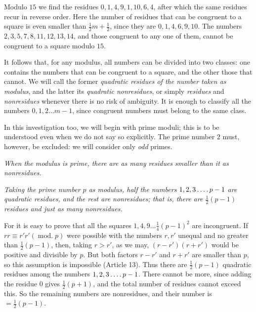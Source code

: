 Modulo $15$ we find the residues $0,1,4,9,1,10,6,4$, after which the same residues recur in reverse order. Here the number of residues that can be congruent to a square is even smaller than $\tfrac12m+\tfrac12$, since they are $0,1,4,6,9,10$. The numbers $2,3,5,7,8,11,12,13,14$, and those congruent to any one of them, cannot be congruent to a square modulo $15$.

It follows that, for any modulus, all numbers can be divided into two classes: one contains the numbers that can be congruent to a square, and the other those that cannot. We will call the former \emph{quadratic residues of the number taken as modulus}, and the latter its \emph{quadratic nonresidues}, or simply \emph{residues} and \emph{nonresidues} whenever there is no risk of ambiguity. It is enough to classify all the numbers $0,1,2\ldots m-1$, since congruent numbers must belong to the same class.

In this investigation too, we will begin with prime moduli; this is to be understood even when we do not say so explicitly. The prime number $2$ must, however, be excluded: we will consider only \emph{odd} primes.

\begin{center}\small\emph{When the modulus is prime, there are as many residues smaller than it as nonresidues.}\end{center}

\emph{Taking the prime number $p$ as modulus, half the numbers $1,2,3\mathinner{\ldotp\ldotp\ldotp\ldotp} p-1$ are quadratic residues, and the rest are nonresidues; that is, there are $\tfrac12(p-1)$ residues and just as many nonresidues.}

For it is easy to prove that all the squares $1,4,9\ldots\tfrac14(p-1)^2$ are incongruent. If $rr\equiv r'r'(\operatorname{mod.}p)$ were possible with the numbers $r,r'$ unequal and no greater than $\tfrac12(p-1)$, then, taking $r>r'$, as we may, $(r-r')(r+r')$ would be positive and divisible by $p$. But both factors $r-r'$ and $r+r'$ are smaller than $p$, so this assumption is impossible (Article 13). Thus there are $\tfrac12(p-1)$ quadratic residues among the numbers $1,2,3\mathinner{\ldotp\ldotp\ldotp\ldotp} p-1$. There cannot be more, since adding the residue $0$ gives $\tfrac12(p+1)$, and the total number of residues cannot exceed this. So the remaining numbers are nonresidues, and their number is $=\tfrac12(p-1)$.

